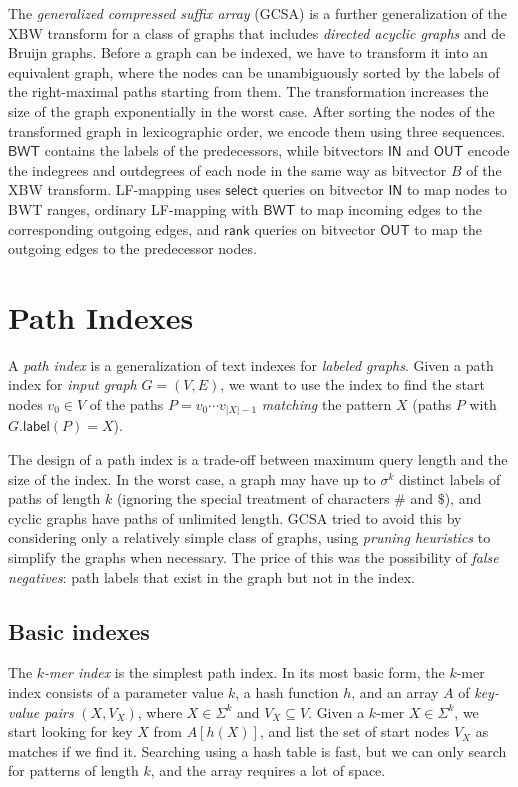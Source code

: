 \documentclass[a4paper,UKenglish]{lipics-v2016}
\newcommand{\abs}[1]{\ensuremath{\lvert #1 \rvert}}
\newcommand{\rank}{\ensuremath{\mathsf{rank}}}
\newcommand{\select}{\ensuremath{\mathsf{select}}}
\newcommand{\glabel}{\ensuremath{\mathsf{label}}}
\newcommand{\kmer}[1]{$#1$\nobreakdash-mer}
\newcommand{\LFmapping}{LF\nobreakdash-mapping}
\newcommand{\BWT}{\ensuremath{\mathsf{BWT}}}
\newcommand{\bvIN}{\ensuremath{\mathsf{IN}}}
\newcommand{\bvOUT}{\ensuremath{\mathsf{OUT}}}
\begin{document}
The \emph{generalized compressed suffix array} (GCSA) \cite{Siren2014} is a further generalization of the XBW transform for a class of graphs that includes \emph{directed acyclic graphs} and de Bruijn graphs. Before a graph can be indexed, we have to transform it into an equivalent graph, where the nodes can be unambiguously sorted by the labels of the right-maximal paths starting from them. The transformation increases the size of the graph exponentially in the worst case. After sorting the nodes of the transformed graph in lexicographic order, we encode them using three sequences. $\BWT$ contains the labels of the predecessors, while bitvectors $\bvIN$ and $\bvOUT$ encode the indegrees and outdegrees of each node in the same way as bitvector $B$ of the XBW transform. \LFmapping{} uses $\select$ queries on bitvector $\bvIN$ to map nodes to BWT ranges, ordinary \LFmapping{} with $\BWT$ to map incoming edges to the corresponding outgoing edges, and $\rank$ queries on bitvector $\bvOUT$ to map the outgoing edges to the predecessor nodes.


\section{Path Indexes}\label{sect:path-indexes}

A \emph{path index} is a generalization of text indexes for \emph{labeled graphs}. Given a path index for \emph{input graph} $G = (V, E)$, we want to use the index to find the start nodes $v_{0} \in V$ of the paths $P = v_{0} \dotsm v_{\abs{X}-1}$ \emph{matching} the pattern $X$ (paths $P$ with $G.\glabel(P) = X$).

The design of a path index is a trade-off between maximum query length and the size of the index. In the worst case, a graph may have up to $\sigma^{k}$ distinct labels of paths of length $k$ (ignoring the special treatment of characters $\#$ and $\$$), and cyclic graphs have paths of unlimited length. GCSA \cite{Siren2014} tried to avoid this by considering only a relatively simple class of graphs, using \emph{pruning heuristics} to simplify the graphs when necessary. The price of this was the possibility of \emph{false negatives}: path labels that exist in the graph but not in the index.

\subsection{Basic indexes}

The \emph{\kmer{k} index} is the simplest path index. In its most basic form, the \kmer{k} index consists of a parameter value $k$, a hash function $h$, and an array $A$ of \emph{key-value pairs} $(X, V_{X})$, where $X \in \Sigma^{k}$ and $V_{X} \subseteq V$. Given a \kmer{k} $X \in \Sigma^{k}$, we start looking for key $X$ from $A[h(X)]$, and list the set of start nodes $V_{X}$ as matches if we find it. Searching using a hash table is fast, but we can only search for patterns of length $k$, and the array requires a lot of space.
\end{document}
